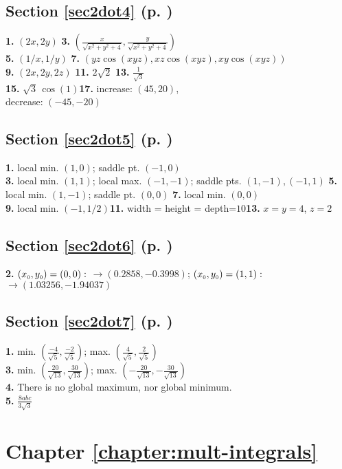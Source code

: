 \begin{multicols}{2}
\subsection*{Section \ref{sec2dot4} (p. \pageref{sec2dot4})}
\textbf{1.} $(2x,2y)$\quad
\textbf{3.} $(\frac{x}{\sqrt{x^2 + y^2 + 4}},\frac{y}{\sqrt{x^2 + y^2 + 4}})$\\
\textbf{5.} $(1/x,1/y)$\quad
\textbf{7.} $(yz\cos(xyz),xz\cos(xyz),xy\cos(xyz))$\\
\textbf{9.} $(2x,2y,2z)$\quad
\textbf{11.} $2\sqrt{2}$\quad
\textbf{13.} $\frac{1}{\sqrt{3}}$\\
\textbf{15.} $\sqrt{3}\,\cos(1)$\quad\textbf{17.} increase: $(45,20)$,\\decrease: $(-45,-20)$
\subsection*{Section \ref{sec2dot5} (p. \pageref{sec2dot5})}
\textbf{1.} local min. $(1,0)$; saddle pt. $(-1,0)$\\\textbf{3.}
local min. $(1,1)$; local max. $(-1,-1)$; saddle pts. $(1,-1),(-1,1)$\quad
\textbf{5.} local min. $(1,-1)$; saddle pt. $(0,0)$\quad
\textbf{7.} local min. $(0,0)$\\\textbf{9.} local min. $(-1,1/2)$\quad\textbf{11.}
width = height = depth=$10$\quad\textbf{13.} $x=y=4$, $z=2$
\subsection*{Section \ref{sec2dot6} (p. \pageref{sec2dot6})}
\textbf{2.} $(x_{\scriptscriptstyle 0},y_{\scriptscriptstyle 0})=(0,0):$ $\rightarrow (0.2858,-0.3998)$;
$(x_{\scriptscriptstyle 0},y_{\scriptscriptstyle 0})=(1,1):$ $\rightarrow (1.03256,-1.94037)$
\subsection*{Section \ref{sec2dot7} (p. \pageref{sec2dot7})}
\textbf{1.} min. $\left(\frac{-4}{\sqrt{5}},\frac{-2}{\sqrt{5}}\right)$;
max. $\left(\frac{4}{\sqrt{5}},\frac{2}{\sqrt{5}}\right)$
\\
\textbf{3.}
min. $\left(\frac{20}{\sqrt{13}},\frac{30}{\sqrt{13}}\right)$;
max. $\left(-\frac{20}{\sqrt{13}},-\frac{30}{\sqrt{13}}\right)$
\\
\textbf{4.} There is no global maximum, nor global minimum.
\\
\textbf{5.} $\frac{8abc}{3\sqrt{3}}$
\section*{Chapter \ref{chapter:mult-integrals}}

\end{multicols}
